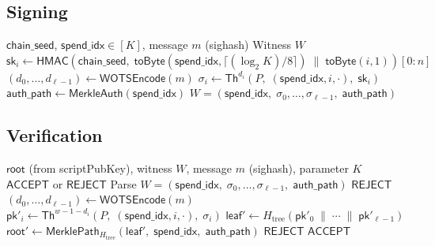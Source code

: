 \documentclass[11pt,a4paper]{article}
\theoremstyle{definition}
\begin{document}
\subsection{Signing}
\label{sec:signing}

\begin{algorithm}[h]
\caption{WOTS-Tree Signing}
\label{alg:signing}
\begin{algorithmic}[1]
\Require $\mathsf{chain\_seed}$, $\mathsf{spend\_idx} \in [K]$, message $m$ (sighash)
\Ensure Witness $W$
    \State $\mathsf{sk}_i \gets \mathsf{HMAC}(\mathsf{chain\_seed},\; \mathsf{toByte}(\mathsf{spend\_idx}, \lceil(\log_2 K) / 8\rceil) \;\|\; \mathsf{toByte}(i, 1))[0:n]$
\EndFor
\State $(d_0, \ldots, d_{\ell-1}) \gets \mathsf{WOTSEncode}(m)$ 
    \State $\sigma_i \gets \mathsf{Th}^{d_i}(P,\; (\mathsf{spend\_idx}, i, \cdot),\; \mathsf{sk}_i)$ 
\EndFor
\State $\mathsf{auth\_path} \gets \mathsf{MerkleAuth}(\mathsf{spend\_idx})$ 
\State \Return $W = (\mathsf{spend\_idx},\; \sigma_0, \ldots, \sigma_{\ell-1},\; \mathsf{auth\_path})$
\end{algorithmic}
\end{algorithm}

\subsection{Verification}
\label{sec:verification}

\begin{algorithm}[h]
\caption{WOTS-Tree Verification (L1 Node)}
\label{alg:verify}
\begin{algorithmic}[1]
\Require $\mathsf{root}$ (from scriptPubKey), witness $W$, message $m$ (sighash), parameter $K$
\Ensure $\mathsf{ACCEPT}$ or $\mathsf{REJECT}$
\State Parse $W = (\mathsf{spend\_idx},\; \sigma_0, \ldots, \sigma_{\ell-1},\; \mathsf{auth\_path})$
 \Return $\mathsf{REJECT}$ 
\EndIf
\State $(d_0, \ldots, d_{\ell-1}) \gets \mathsf{WOTSEncode}(m)$ 
 
    \State $\mathsf{pk}'_i \gets \mathsf{Th}^{w-1-d_i}(P,\; (\mathsf{spend\_idx}, i, \cdot),\; \sigma_i)$
\EndFor
\State $\mathsf{leaf}' \gets H_{\mathrm{tree}}(\mathsf{pk}'_0 \;\|\; \cdots \;\|\; \mathsf{pk}'_{\ell-1})$ 
\State $\mathsf{root}' \gets \mathsf{MerklePath}_{H_{\mathrm{tree}}}(\mathsf{leaf}',\; \mathsf{spend\_idx},\; \mathsf{auth\_path})$ 
 \Return $\mathsf{REJECT}$
\EndIf
\State \Return $\mathsf{ACCEPT}$
\end{algorithmic}
\end{algorithm}
\end{document}
